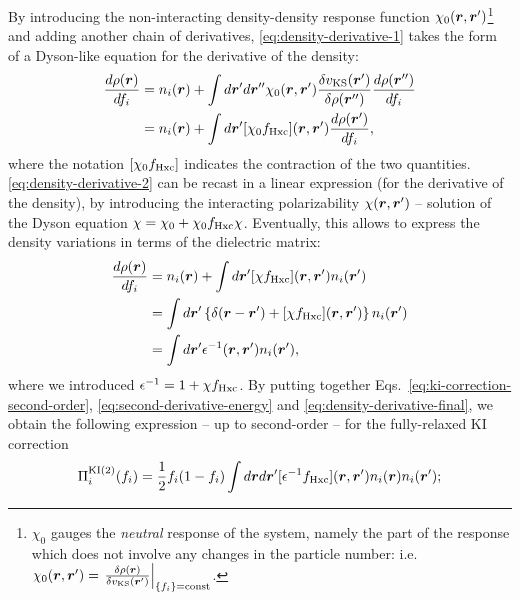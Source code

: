 %
By introducing the non-interacting density-density response function $\chi_0({\bm r},{\bm r}')$\footnote{$\chi_0$ gauges the \emph{neutral} response of the system, namely the part of the response which does not involve any changes in the particle number: i.e. $\chi_0({\bm r},{\bm r}') = \left. \frac{\delta\rho({\bm r})}{\delta v_{\rm KS}({\bm r}')} \right|_{\{ f_i \} = {\rm const}}$.} and adding another chain of derivatives, \cref{eq:density-derivative-1} takes the form of a Dyson-like equation for the derivative of the density:
%
\begin{equation}
    \begin{split}
    \frac{d\rho({\bm r})}{df_i} &= n_i({\bm r}) + \int d{\bm r}' d{\bm r}'' \chi_0({\bm r},{\bm r}') \frac{\delta v_{\rm KS}({\bm r}')}{\delta \rho({\bm r}'')} \frac{d\rho({\bm r}'')}{df_i} \\
    &= n_i({\bm r}) + \int d{\bm r}' [\chi_0 f_{\rm Hxc}]({\bm r},{\bm r}') \frac{d\rho({\bm r}')}{df_i} ,
    \end{split}
    \label{eq:density-derivative-2}
\end{equation}
%
where the notation $[\chi_0 f_{\rm Hxc}]$ indicates the contraction of the two quantities. \cref{eq:density-derivative-2} can be recast in a linear expression (for the derivative of the density), by introducing the interacting polarizability $\chi({\bm r},{\bm r}')$ -- solution of the Dyson equation $\chi = \chi_0 + \chi_0 f_{\rm Hxc} \chi$. Eventually, this allows to express the density variations in terms of the dielectric matrix:
%
\begin{equation}
    \begin{split}
    \frac{d\rho({\bm r})}{df_i} &= n_i({\bm r}) + \int d{\bm r}' [\chi f_{\rm Hxc}]({\bm r},{\bm r}') n_i({\bm r}') \\
    &= \int d{\bm r}' \left\{ \delta({\bm r}-{\bm r}') + [\chi f_{\rm Hxc}]({\bm r},{\bm r}') \right\} n_i({\bm r}') \\
    &= \int d{\bm r}' \epsilon^{-1}({\bm r},{\bm r}') n_i({\bm r}') ,
    \end{split}
    \label{eq:density-derivative-final}
\end{equation}
%
where we introduced $\epsilon^{-1} = 1 + \chi f_{\rm Hxc}$. By putting together Eqs.~\eqref{eq:ki-correction-second-order}, \eqref{eq:second-derivative-energy} and \eqref{eq:density-derivative-final}, we obtain the following expression -- up to second-order -- for the fully-relaxed KI correction
%
\begin{equation}
    \Pi_i^{\rm KI(2)}(f_i) = \frac{1}{2} f_i(1-f_i) \int d{\bm r} d{\bm r}' [\epsilon^{-1} f_{\rm Hxc}]({\bm r},{\bm r}') n_i({\bm r}) n_i({\bm r}') ;
    \label{eq:relaxed-ki-second-order}
\end{equation}
